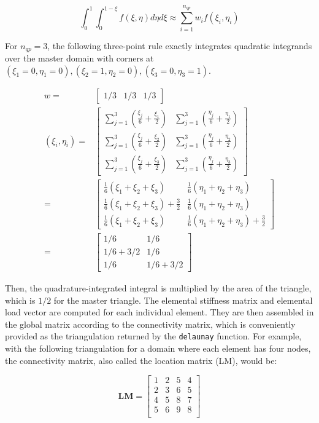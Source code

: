 \documentclass[10pt]{article}
\newcommand{\beq}{\begin{equation}}
\newcommand{\eeq}{\end{equation}}
\newcommand{\beqa}{\begin{equation}\begin{aligned}}
\newcommand{\eeqa}{\end{aligned}\end{equation}}
\begin{document}
\beq
\int_{0}^{1} \int_{0}^{1-\xi}f(\xi,\eta)d\eta d\xi\approx\sum_{i=1}^{n_{qp}}w_if(\xi_i,\eta_i)
\eeq

For \(n_{qp}=3\), the following three-point rule exactly integrates quadratic integrands over the master domain with corners at \((\xi_1=0,\eta_1=0), (\xi_2=1,\eta_2=0), (\xi_3=0,\eta_3=1)\).

\beqa
w=&\begin{bmatrix}1/3& 1/3& 1/3\end{bmatrix}\\
(\xi_i,\eta_i)=&\begin{bmatrix}\sum_{j=1}^3\left(\frac{\xi_j}{6}+\frac{\xi_1}{2}\right) & \sum_{j=1}^3\left(\frac{\eta_j}{6}+\frac{\eta_1}{2}\right)\\
\sum_{j=1}^3\left(\frac{\xi_j}{6}+\frac{\xi_2}{2}\right) & \sum_{j=1}^3\left(\frac{\eta_j}{6}+\frac{\eta_2}{2}\right)\\
\sum_{j=1}^3\left(\frac{\xi_j}{6}+\frac{\xi_3}{2}\right) & \sum_{j=1}^3\left(\frac{\eta_j}{6}+\frac{\eta_3}{2}\right)
 \end{bmatrix}\\
=&\begin{bmatrix}\frac{1}{6}\left(\xi_1+\xi_2+\xi_3\right) & \frac{1}{6}\left(\eta_1+\eta_2+\eta_3\right)\\
\frac{1}{6}\left(\xi_1+\xi_2+\xi_3\right)+\frac{3}{2} & \frac{1}{6}\left(\eta_1+\eta_2+\eta_3\right)\\
\frac{1}{6}\left(\xi_1+\xi_2+\xi_3\right) & \frac{1}{6}\left(\eta_1+\eta_2+\eta_3\right)+\frac{3}{2}
 \end{bmatrix}\\
 =&\begin{bmatrix}1/6 & 1/6\\
1/6+3/2 & 1/6\\
1/6 & 1/6+3/2
 \end{bmatrix}
\eeqa

Then, the quadrature-integrated integral is multiplied by the area of the triangle, which is \(1/2\) for the master triangle. The elemental stiffness matrix and elemental load vector are computed for each individual element. They are then assembled in the global matrix according to the connectivity matrix, which is conveniently provided as the triangulation returned by the {\tt delaunay} function. For example, with the following triangulation for a domain where each element has four nodes, the connectivity matrix, also called the location matrix (LM), would be:

\begin{equation}
\textbf{LM}=\begin{bmatrix}
1 & 2 & 5 & 4\\
2 & 3 & 6 & 5\\
4 & 5 & 8 & 7\\
5 & 6 & 9 & 8\\
\end{bmatrix}
\end{equation}
\end{document}
